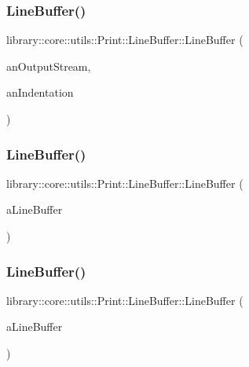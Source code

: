 \subsubsection{\texorpdfstring{LineBuffer()}{LineBuffer()}\hspace{0.1cm}{\footnotesize\ttfamily [1/3]}}
{\footnotesize\ttfamily library\+::core\+::utils\+::\+Print\+::\+Line\+Buffer\+::\+Line\+Buffer (\begin{DoxyParamCaption}\item[{std\+::ostream \&}]{an\+Output\+Stream,  }\item[{uint}]{an\+Indentation }\end{DoxyParamCaption})}

\mbox{\label{classlibrary_1_1core_1_1utils_1_1_print_1_1_line_buffer_afc353daf14e3a1f76f6d7b73907e3bbe}} 
\subsubsection{\texorpdfstring{LineBuffer()}{LineBuffer()}\hspace{0.1cm}{\footnotesize\ttfamily [2/3]}}
{\footnotesize\ttfamily library\+::core\+::utils\+::\+Print\+::\+Line\+Buffer\+::\+Line\+Buffer (\begin{DoxyParamCaption}\item[{const \mbox{\hyperlink{classlibrary_1_1core_1_1utils_1_1_print_1_1_line_buffer}{Line\+Buffer}} \&}]{a\+Line\+Buffer }\end{DoxyParamCaption})\hspace{0.3cm}{\ttfamily [delete]}}

\mbox{\label{classlibrary_1_1core_1_1utils_1_1_print_1_1_line_buffer_a45f71ed47bf91cb76c31135e04a60a7b}} 
\subsubsection{\texorpdfstring{LineBuffer()}{LineBuffer()}\hspace{0.1cm}{\footnotesize\ttfamily [3/3]}}
{\footnotesize\ttfamily library\+::core\+::utils\+::\+Print\+::\+Line\+Buffer\+::\+Line\+Buffer (\begin{DoxyParamCaption}\item[{\mbox{\hyperlink{classlibrary_1_1core_1_1utils_1_1_print_1_1_line_buffer}{Line\+Buffer}} \&\&}]{a\+Line\+Buffer }\end{DoxyParamCaption})\hspace{0.3cm}{\ttfamily [default]}}

